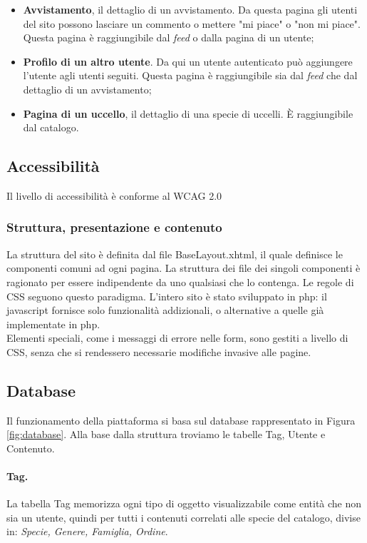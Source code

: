 \documentclass[12pt, a4paper]{article}
\begin{document}
    \begin{itemize}
        \item \textbf{Avvistamento}, il dettaglio di un avvistamento. Da questa pagina gli utenti del sito possono lasciare un commento o mettere "mi piace" o "non mi piace". Questa pagina è raggiungibile dal \textit{feed} o dalla pagina di un utente;
        \item \textbf{Profilo di un altro utente}. Da qui un utente autenticato può aggiungere l'utente agli utenti seguiti. Questa pagina è raggiungibile sia dal \textit{feed} che dal dettaglio di un avvistamento;
        \item \textbf{Pagina di un uccello}, il dettaglio di una specie di uccelli. È raggiungibile dal catalogo.
    \end{itemize}

    \subsection{Accessibilità}
    Il livello di accessibilità è conforme al WCAG 2.0
    \subsubsection*{Struttura, presentazione e contenuto}
    La struttura del sito è definita dal file BaseLayout.xhtml, il quale definisce le componenti comuni ad ogni pagina. La struttura dei file dei singoli componenti è ragionato per essere indipendente da uno qualsiasi che lo contenga. Le regole di CSS seguono questo paradigma. L'intero sito è stato sviluppato in php: il javascript fornisce solo funzionalità addizionali, o alternative a quelle già implementate in php. \\
    Elementi speciali, come i messaggi di errore nelle form, sono gestiti a livello di CSS, senza che si rendessero necessarie modifiche invasive alle pagine.
    \subsection{Database}
    Il funzionamento della piattaforma si basa sul database rappresentato in Figura \ref{fig:database}.
    Alla base dalla struttura troviamo le tabelle Tag, Utente e Contenuto.
    \paragraph{Tag.} La tabella Tag memorizza ogni tipo di oggetto visualizzabile come entità che non sia un utente,
                    quindi per tutti i contenuti correlati alle specie del catalogo, divise in: \emph{Specie, Genere, Famiglia, Ordine}.
\end{document}
